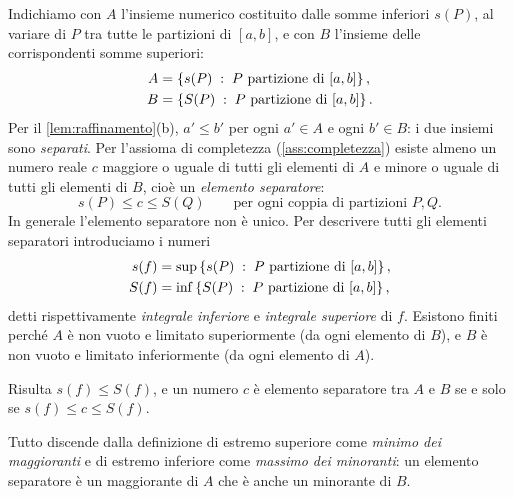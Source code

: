 Indichiamo con $A$ l'insieme numerico costituito dalle somme inferiori $s(P)$, al variare
di $P$ tra tutte le partizioni di $[a,b]$, e con $B$ l'insieme delle corrispondenti somme
superiori:
\begin{equation}\label{eq:insiemi-A-B}
\begin{aligned}
  A&=\left\{ s(P) \;:\; P \text{ partizione di }[a,b] \right\},\\
  B&=\left\{ S(P) \;:\; P \text{ partizione di }[a,b] \right\} .
\end{aligned}
\end{equation}
Per il \cref{lem:raffinamento}(b), $a'\le b'$ per ogni $a'\in A$ e ogni $b'\in B$: i due
insiemi sono \emph{separati}. Per l'assioma di completezza (\cref{ass:completezza})
esiste almeno un numero reale $c$ maggiore o uguale di tutti gli elementi di $A$ e
minore o uguale di tutti gli elementi di $B$, cioè un \emph{elemento separatore}:
\[
  s(P)\le c\le S(Q) \qquad\text{per ogni coppia di partizioni } P, Q .
\]
In generale l'elemento separatore non è unico. Per descrivere tutti gli elementi
separatori introduciamo i numeri
\begin{equation}\label{eq:integrali-inf-sup}
\begin{aligned}
  s(f)&=\sup\left\{ s(P) \;:\; P \text{ partizione di }[a,b] \right\},\\
  S(f)&=\inf\left\{ S(P) \;:\; P \text{ partizione di }[a,b] \right\},
\end{aligned}
\end{equation}
detti rispettivamente \emph{integrale inferiore} e \emph{integrale superiore} di $f$.
Esistono finiti perché $A$ è non vuoto e limitato superiormente (da ogni elemento di
$B$), e $B$ è non vuoto e limitato inferiormente (da ogni elemento di $A$).

\begin{proposizione}\label{prop:separatori}
Risulta $s(f)\le S(f)$, e un numero $c$ è elemento separatore tra $A$ e $B$ se e solo se
$s(f)\le c\le S(f)$.
\end{proposizione}

\begin{schema}
\end{schema}

\begin{strategia}
Tutto discende dalla definizione di estremo superiore come \emph{minimo dei maggioranti}
e di estremo inferiore come \emph{massimo dei minoranti}: un elemento separatore è un
maggiorante di $A$ che è anche un minorante di $B$.
\end{strategia}

